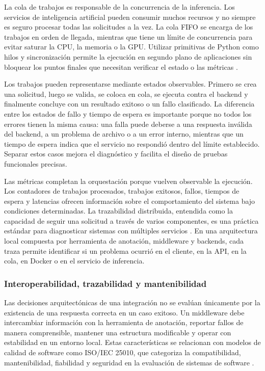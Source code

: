 \documentclass[11pt,a4paper]{article}
\begin{document}
La cola de trabajos es responsable de la concurrencia de la inferencia. Los servicios de inteligencia artificial pueden consumir muchos recursos y no siempre es seguro procesar todas las solicitudes a la vez. La cola FIFO se encarga de los trabajos en orden de llegada, mientras que tiene un límite de concurrencia para evitar saturar la CPU, la memoria o la GPU. Utilizar primitivas de Python como hilos y sincronización permite la ejecución en segundo plano de aplicaciones sin bloquear los puntos finales que necesitan verificar el estado o las métricas \cite{python_threading}.

Los trabajos pueden representarse mediante estados observables. Primero se crea una solicitud, luego se valida, se coloca en cola, se ejecuta contra el backend y finalmente concluye con un resultado exitoso o un fallo clasificado. La diferencia entre los estados de fallo y tiempo de espera es importante porque no todos los errores tienen la misma causa: una falla puede deberse a una respuesta inválida del backend, a un problema de archivo o a un error interno, mientras que un tiempo de espera indica que el servicio no respondió dentro del límite establecido. Separar estos casos mejora el diagnóstico y facilita el diseño de pruebas funcionales precisas.

Las métricas completan la orquestación porque vuelven observable la ejecución. Los contadores de trabajos procesados, trabajos exitosos, fallos, tiempos de espera y latencias ofrecen información sobre el comportamiento del sistema bajo condiciones determinadas. La trazabilidad distribuida, entendida como la capacidad de seguir una solicitud a través de varios componentes, es una práctica estándar para diagnosticar sistemas con múltiples servicios \cite{sigelman2010dapper}. En una arquitectura local compuesta por herramienta de anotación, middleware y backends, cada traza permite identificar si un problema ocurrió en el cliente, en la API, en la cola, en Docker o en el servicio de inferencia.

\subsubsection{Interoperabilidad, trazabilidad y mantenibilidad}

Las decisiones arquitectónicas de una integración no se evalúan únicamente por la existencia de una respuesta correcta en un caso exitoso. Un middleware debe intercambiar información con la herramienta de anotación, reportar fallos de manera comprensible, mantener una estructura modificable y operar con estabilidad en un entorno local. Estas características se relacionan con modelos de calidad de software como ISO/IEC 25010, que categoriza la compatibilidad, mantenibilidad, fiabilidad y seguridad en la evaluación de sistemas de software \cite{iso25010}.
\end{document}
